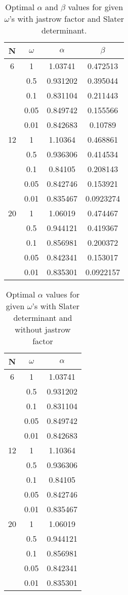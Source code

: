 \documentclass[english, a4paper]{article}
\begin{document}
\begin{table}[H]
\caption{Optimal $\alpha$ and $\beta$ values for given $\omega$'s  with jastrow factor and Slater determinant.}
\centering
\begin{tabular}{ c c c c }
\hline
\hline
 N & $\omega$ & $\alpha$ & $\beta$ \\
\hline
 6  & 1    & 1.03741   & 0.472513\\
   & 0.5  & 0.931202  & 0.395044\\
   & 0.1  & 0.831104  & 0.211443\\
   & 0.05 & 0.849742  & 0.155566\\
   & 0.01 & 0.842683  & 0.10789\\
 \hline 
12 & 1    & 1.10364   & 0.468861\\
   & 0.5  & 0.936306  & 0.414534\\
   & 0.1  & 0.84105   & 0.208143 \\
   & 0.05 & 0.842746  & 0.153921\\
   & 0.01 & 0.835467  & 0.0923274\\
   \hline
20 & 1    & 1.06019   & 0.474467\\
   & 0.5  & 0.944121  & 0.419367\\
   & 0.1  & 0.856981  & 0.200372\\
   & 0.05 & 0.842341  & 0.153017\\
   & 0.01 & 0.835301  & 0.0922157\\
   \hline
   \hline
\end{tabular}
\end{table}


\begin{table}[H]
\caption{Optimal $\alpha$ values for given $\omega$'s with Slater determinant and without jastrow factor}
\centering
\begin{tabular}{ c c c  }
\hline
\hline
N & $\omega$ & $\alpha$  \\
\hline
6  & 1    & 1.03741 \\  
   & 0.5  & 0.931202  \\
   & 0.1  & 0.831104  \\
   & 0.05 & 0.849742  \\
   & 0.01 & 0.842683  \\
\hline  
12 & 1    & 1.10364   \\
   & 0.5  & 0.936306  \\
   & 0.1  & 0.84105   \\
   & 0.05 & 0.842746  \\
   & 0.01 & 0.835467  \\
\hline   
20 & 1    & 1.06019   \\
   & 0.5  & 0.944121  \\
   & 0.1  & 0.856981  \\
   & 0.05 & 0.842341  \\
   & 0.01 & 0.835301  \\
\hline
\hline
   \end{tabular}
\end{table}
\end{document}

